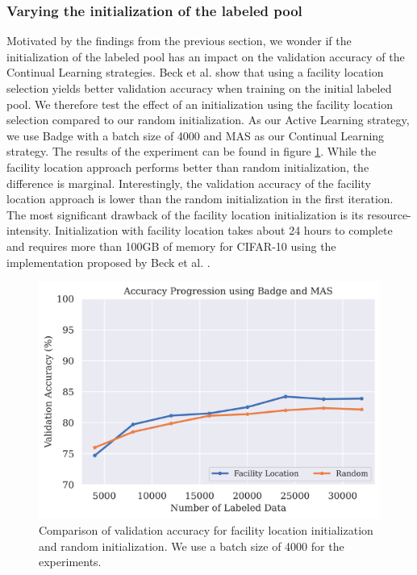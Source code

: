 \subsubsection{Varying the initialization of the labeled pool}
\label{sec:Evaluation:Results:CAL:Initialization}
Motivated by the findings from the previous section, we wonder if the initialization of the labeled pool has an impact on the validation accuracy of the Continual Learning strategies. Beck et al.\cite{beck2021effective} show that using a facility location selection 
\cite{iyer2021submodular} yields better validation accuracy when training on the initial labeled pool. We therefore test the effect of an initialization using the facility location selection compared to our random initialization. As our Active Learning strategy,
we use Badge with a batch size of 4000 and MAS as our Continual Learning strategy. The results of the experiment can be found in figure \ref{fig:Evaluation:Results:CAL:FLinit}. While the facility location approach performs better than random initialization, the difference is
marginal. Interestingly, the validation accuracy of the facility location approach is lower than the random initialization in the first iteration. The most significant drawback of the facility location initialization is its resource-intensity. Initialization with facility
location takes about 24 hours to complete and requires more than 100GB of memory for CIFAR-10 using the implementation proposed by Beck et al. \cite{beck2021effective}. \par

\begin{figure}[h]
    \centering
    \includegraphics[width=\linewidth]{images/results_CAL/Factility_location_init.png}
    \caption[Initialization using Facility Location]{Comparison of validation accuracy for facility location initialization and random initialization. We use a batch size of 4000 for the experiments.}
    \label{fig:Evaluation:Results:CAL:FLinit}
\end{figure}


